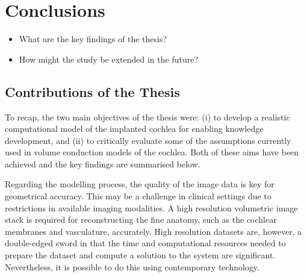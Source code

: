 	\pagestyle{fancy}
	\lhead{{\sffamily \MakeUppercase\leftmark}}
	\chead{}
	\rhead{{\sffamily \MakeUppercase\rightmark}}
	\lfoot{}
	\cfoot{{\sffamily \thepage}}
	\rfoot{}
	
\chapter{Conclusions}

\begin{center}
	\begin{tcolorbox}[title=\boxtitle]
		\begin{itemize}[leftmargin=*,labelindent=2ex,labelsep=1.5ex,itemsep=0pt,parsep=0pt]
			\item What are the key findings of the thesis?
			\item How might the study be extended in the future?
		\end{itemize}
	\end{tcolorbox}
\end{center}

\section{Contributions of the Thesis}

To recap, the two main objectives of the thesis were: (i) to develop a realistic
computational model of the implanted cochlea for enabling knowledge development,
and (ii) to critically evaluate some of the assumptions currently used in volume
conduction models of the cochlea. Both of these aims have been achieved and the
key findings are summarised below.

Regarding the modelling process, the quality of the image data is key for
geometrical accuracy. This may be a challenge in clinical settings due to
restrictions in available imaging modalities. A high resolution volumetric
image stack is required for reconstructing the fine anatomy, such as the
cochlear membranes and vasculature, accurately. High resolution datasets are,
however, a double-edged sword in that the time and computational resources
needed to prepare the dataset and compute a solution to the system are
significant. Nevertheless, it is possible to do this using contemporary
technology.


